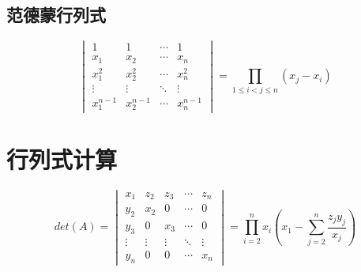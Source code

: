 \subsection{范德蒙行列式}
\begin{corollary}[范德蒙行列式]
	
	$$\begin{vmatrix}
		1           & 1           & \cdots & 1\\
		x_{1}       & x_{2}       & \cdots & x_{n}\\
		x_{1}^{2}   & x_{2}^{2}   & \cdots & x_{n}^{2}\\
		\vdots      & \vdots      & \ddots & \vdots\\
		x_{1}^{n-1} & x_{2}^{n-1} & \cdots & x_{n}^{n-1}
	\end{vmatrix} = \prod\limits_{1 \leq i < j \leq n}(x_{j}-x_{i})$$
\end{corollary}
\section{行列式计算}
\begin{proposition}[爪型行列式]
	$$det(A) = \begin{vmatrix}
		x_{1}  & z_{2}  & z_{3}  & \cdots & z_{n}\\
		y_{2}  & x_{2}  & 0      & \cdots & 0\\
		y_{3}  & 0      & x_{3}  & \cdots & 0\\
		\vdots & \vdots & \vdots & \ddots & \vdots\\
		y_{n}  & 0      & 0      & \cdots & x_{n}
	\end{vmatrix} =  \prod\limits_{i=2}^{n}x_{i}\left(x_{1} - \sum\limits_{j=2}^{n}\dfrac{z_{j}y_{j}}{x_{j}}\right)$$
\end{proposition}


